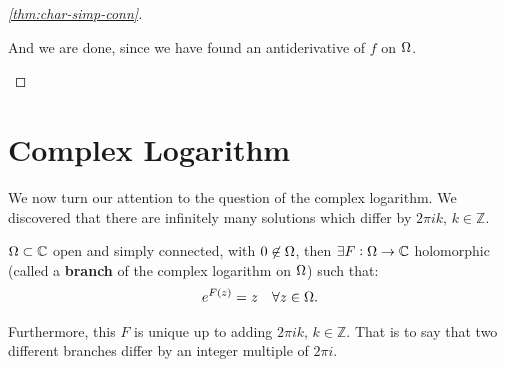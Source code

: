 \begin{proof}[\ref{thm:char-simp-conn}]
\begin{enumerate}
    And we are done, since we have found an antiderivative of $f$ on $\Omega$.
    
    
    
    
    
\end{enumerate}    

\end{proof}



\section{Complex Logarithm}

We now turn our attention to the question of the complex logarithm. We discovered that there are infinitely many solutions which differ by $2 \pi i k, \, k \in \mathbb{Z}$.

\begin{theorem}\label{thm:complex-log}
$\Omega \subset \mathbb{C}$ open and simply connected, with $0 \not\in \Omega$, then $\exists F : \Omega \to \mathbb{C}$ holomorphic (called a \textbf{branch} of the complex logarithm on $\Omega$) such that:
\begin{align*}
    e^{F(z)} &= z  &\forall z \in \Omega.
\end{align*}

Furthermore, this $F$ is unique up to adding $2 \pi i k, \, k \in \mathbb{Z}$. That is to say that two different branches differ by an integer multiple of $2 \pi i$.
\end{theorem}

